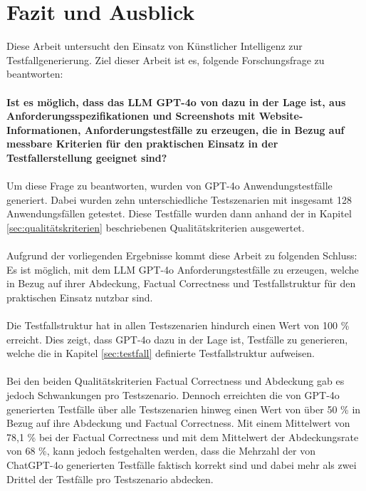 \documentclass[12pt,toc=bib,toc=listof]{scrreprt}
\begin{document}
\chapter{Fazit und Ausblick} %
\label{sec:fazitUndAusblick}
Diese Arbeit untersucht den Einsatz von Künstlicher Intelligenz zur Testfallgenerierung. Ziel dieser Arbeit ist es, folgende Forschungsfrage zu beantworten:\\
\\
\textbf{Ist es möglich, dass das LLM GPT-4o von \textcite{OpenAI2025} dazu in der Lage ist, aus Anforderungsspezifikationen und Screenshots mit Website-Informationen, Anforderungstestfälle zu erzeugen, die in Bezug auf messbare Kriterien für den praktischen Einsatz in der Testfallerstellung geeignet sind?}\\
\\
Um diese Frage zu beantworten, wurden von GPT-4o Anwendungstestfälle generiert. Dabei wurden zehn unterschiedliche Testszenarien mit insgesamt 128 Anwendungsfällen getestet. Diese Testfälle wurden dann anhand der in Kapitel \ref{sec:qualitätskriterien} beschriebenen Qualitätskriterien ausgewertet.\\
\\
Aufgrund der vorliegenden Ergebnisse kommt diese Arbeit zu folgenden Schluss:\\
\noindent Es ist möglich, mit dem LLM GPT-4o Anforderungstestfälle zu erzeugen, welche in Bezug auf ihrer Abdeckung, Factual Correctness und Testfallstruktur für den praktischen Einsatz nutzbar sind.\\
\\
Die Testfallstruktur hat in allen Testszenarien hindurch einen Wert von 100 \% erreicht. Dies zeigt, dass GPT-4o dazu in der Lage ist, Testfälle zu generieren, welche die in Kapitel \ref{sec:testfall} definierte Testfallstruktur aufweisen.\\
\\
Bei den beiden Qualitätskriterien \glqq Factual Correctness\grqq{} und \glqq Abdeckung\grqq{} gab es jedoch Schwankungen pro Testszenario. Dennoch erreichten die von GPT-4o generierten Testfälle über alle Testszenarien hinweg einen Wert von über 50 \% in Bezug auf ihre Abdeckung und Factual Correctness. Mit einem Mittelwert von 78,1 \% bei der Factual Correctness und mit dem Mittelwert der Abdeckungsrate von 68 \%, kann jedoch festgehalten werden, dass die Mehrzahl der von ChatGPT-4o generierten Testfälle faktisch korrekt sind und dabei mehr als zwei Drittel der Testfälle pro Testszenario abdecken.\\
\end{document}
